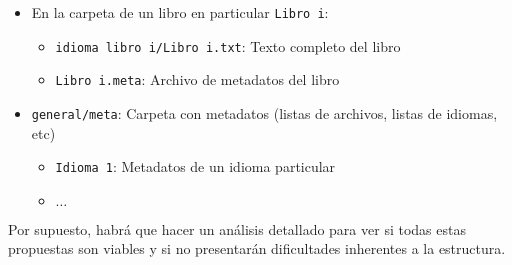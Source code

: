 \documentclass[11pt]{article}
\begin{document}
\begin{itemize}
	\item En la carpeta de un libro en particular \texttt{Libro i}:
	\begin{itemize}
		\item \texttt{idioma libro i/Libro i.txt}: Texto completo del libro
		\item \texttt{Libro i.meta}: Archivo de metadatos del libro
	\end{itemize}
	\item \texttt{general/meta}: Carpeta con metadatos (listas de archivos, listas de idiomas, etc)
	\begin{itemize}
		\item \texttt{Idioma 1}: Metadatos de un idioma particular
		\item $\dots$
	\end{itemize}
\end{itemize}

Por supuesto, habrá que hacer un análisis detallado para ver si todas estas propuestas son viables y si no presentarán dificultades inherentes a la estructura.
\end{document}
